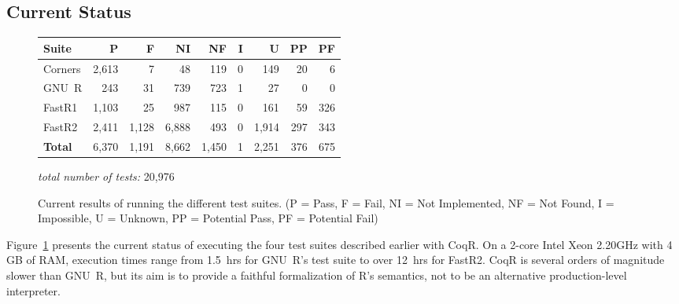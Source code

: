 \documentclass[
    sigplan,
    10pt,
    review, %
    natbib=false %
 ]{acmart}
\newcommand\eti[1]{\todo[color=blue!20,inline]{#1}}
\newcommand\CoqR{CoqR}
\newcommand\newtext[1]{{\color{blue} #1}}
\begin{document}



\subsection{Current Status}
\label{sec:testing-results}



\begin{figure}[]
\centering
\begin{tabular}{|l||r|r|r|r|r|r|r|r|}
\hline
{\bf Suite}  & {\bf P} & {\bf F} & {\bf NI} & {\bf NF} & {\bf I} & {\bf U} & {\bf PP} & {\bf PF} \\ \hline\hline
Corners     & 2,613 & 7     & 48     &   119    & 0   & 149    &   20  & 6 \\ \hline
GNU~R       & 243   & 31    & 739    &   723    & 1   & 27     &   0   & 0 \\ \hline
FastR1      & 1,103 & 25    & 987    &   115    & 0   & 161    &   59  & 326 \\ \hline
FastR2      & 2,411 & 1,128 & 6,888  &   493    & 0   & 1,914  &   297 & 343 \\ \hline\hline
{\bf Total} & 6,370 & 1,191 & 8,662  &   1,450  &  1  & 2,251  &   376 & 675 \\
\hline
\end{tabular}
{\em total number of tests:} 20,976
\caption{Current results of running the different test suites.
{\footnotesize (P = Pass, F = Fail, NI = Not Implemented, NF = Not Found, \newline I = Impossible, U = Unknown, PP = Potential Pass, PF = Potential Fail)}}
\label{fig:results}
\end{figure}


Figure~\ref{fig:results} presents the current status of executing the four test suites described earlier with \CoqR{}.
On a 2-core Intel Xeon 2.20GHz with 4 GB of RAM, execution times range from 1.5~hrs for GNU~R's test suite to over 12~hrs for FastR2.
\newtext{\CoqR{} is several orders of magnitude slower than GNU~R, but its aim is to provide a faithful formalization of R's semantics, not to be an alternative production-level interpreter.}
\end{document}
